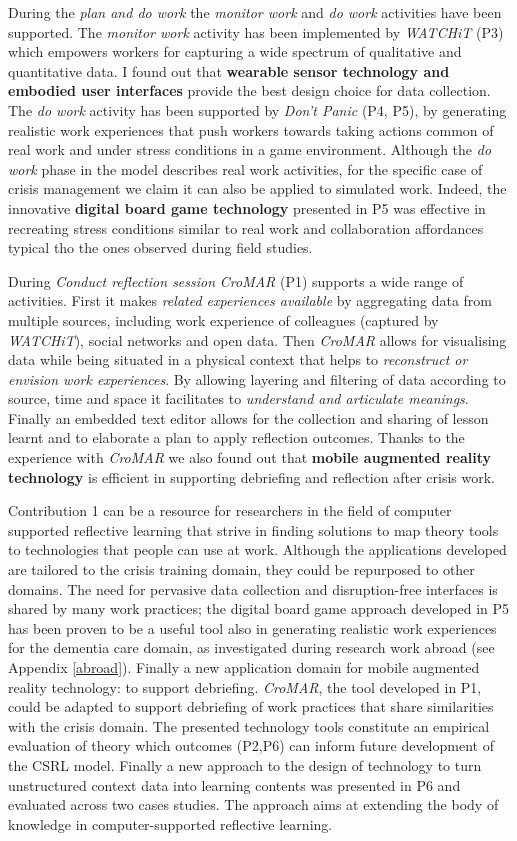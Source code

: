 During the \emph{plan and do work} the \emph{monitor work} and \emph{do work} activities have been supported. The \emph{monitor work} activity has been implemented by \emph{WATCHiT} (P3) which empowers workers for capturing a wide spectrum of qualitative and quantitative data. I found out that \textbf{wearable sensor technology and embodied user interfaces} provide the best design choice for data collection. The \emph{do work} activity has been supported by \emph{Don't Panic} (P4, P5), by generating realistic work experiences that push workers towards taking actions common of real work and under stress conditions in a game environment. Although the \emph{do work} phase in the model describes real work activities, for the specific case of crisis management we claim it can also be applied to simulated work. Indeed, the innovative \textbf{digital board game technology} presented in P5 was effective in recreating stress conditions similar to real work and collaboration affordances typical tho the ones observed during field studies.

During \emph{Conduct reflection session} \emph{CroMAR} (P1) supports a wide range of activities. First it makes \emph{related experiences available} by aggregating data from multiple sources, including work experience of colleagues (captured by \emph{WATCHiT}), social networks and open data. Then \emph{CroMAR} allows for visualising data while being situated in a physical context that helps to \emph{reconstruct or envision work experiences}. By allowing layering and filtering of data according to source, time and space it facilitates to \emph{understand and articulate meanings}. Finally an embedded text editor allows for the collection and sharing of lesson learnt and to elaborate a plan to apply reflection outcomes. Thanks to the experience with \emph{CroMAR} we also found out that \textbf{mobile augmented reality technology} is efficient in supporting debriefing and reflection after crisis work.

Contribution 1 can be a resource for researchers in the field of computer supported reflective learning that strive in finding solutions to map theory tools to technologies that people can use at work. Although the applications developed are tailored to the crisis training domain, they could be repurposed to other domains. The need for pervasive data collection and disruption-free interfaces is shared by many work practices; the digital board game approach developed in P5 has been proven to be a useful tool also in generating realistic work experiences for the dementia care domain, as investigated during research work abroad (see Appendix \ref{abroad}). Finally a new application domain for mobile augmented reality technology: to support debriefing. \emph{CroMAR}, the tool developed in P1, could be adapted to support debriefing of work practices that share similarities with the crisis domain. The presented technology tools constitute an empirical evaluation of theory which outcomes (P2,P6) can inform future development of the CSRL model. Finally a new approach to the design of technology to turn unstructured context data into learning contents was presented in P6 and evaluated across two cases studies. The approach aims at extending the body of knowledge in computer-supported reflective learning.

